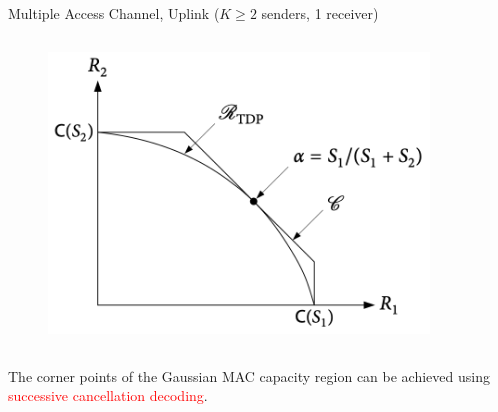 \documentclass[aspectratio=43, 10pt]{beamer}
\begin{document}
\begin{frame}[t]{Multiple Access Channel, Uplink \small ($K\geq2$ senders, 1 receiver)}
\begin{columns}
    
    \begin{column}{0.43\textwidth}
        \begin{figure}
        \centering
            \includegraphics[width=0.9\textwidth]{figures/2tGMAC_pc.png}
        \end{figure}
    \end{column}
    
    \end{columns}

    \vfill

    \small The corner points of the Gaussian MAC capacity region can be achieved using \textcolor{red}{successive cancellation decoding}.         
    \end{frame}
\end{document}
